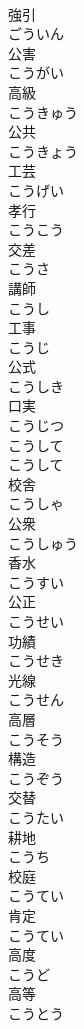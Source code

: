 \documentclass[8pt]{extreport}
\begin{document}
\begin{CJK}{UTF8}{min}
\\	強引 
\\	ごういん	
\\	公害 
\\	こうがい	
\\	高級 
\\	こうきゅう	
\\	公共 
\\	こうきょう	
\\	工芸 
\\	こうげい	
\\	孝行 
\\	こうこう	
\\	交差 
\\	こうさ	
\\	講師 
\\	こうし	
\\	工事 
\\	こうじ	
\\	公式 
\\	こうしき	
\\	口実 
\\	こうじつ	
\\	こうして 
\\	こうして	
\\	校舎 
\\	こうしゃ	
\\	公衆 
\\	こうしゅう	
\\	香水 
\\	こうすい	
\\	公正 
\\	こうせい	
\\	功績 
\\	こうせき	
\\	光線 
\\	こうせん	
\\	高層 
\\	こうそう	
\\	構造 
\\	こうぞう	
\\	交替 
\\	こうたい	
\\	耕地 
\\	こうち	
\\	校庭 
\\	こうてい	
\\	肯定 
\\	こうてい	
\\	高度 
\\	こうど	
\\	高等 
\\	こうとう	

\end{CJK}
\end{document}
